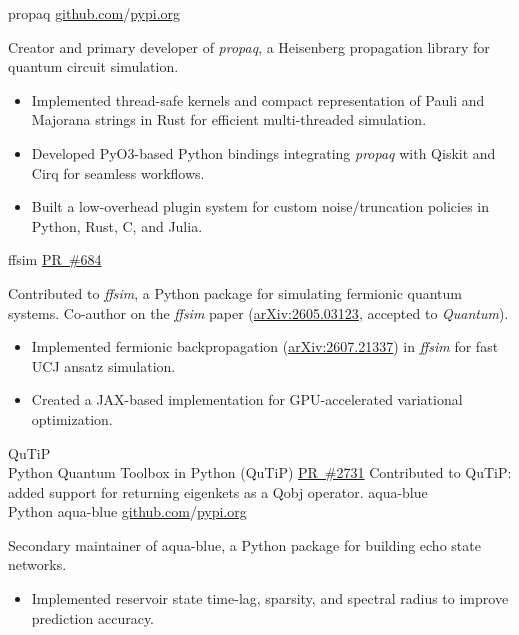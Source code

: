 \documentclass[9pt]{developercv} %
\let\oldhref\href
\newcommand{\linkul}[1]{\setbox0\hbox{#1}\rlap{\textcolor{black!35}{\rule[-1.6pt]{\wd0}{0.3pt}}}\box0}
\renewcommand{\href}[2]{\oldhref{#1}{\linkul{#2}}}
\begin{document}
\begin{entrylist}
		{propaq}
		{\href{https://github.com/hkbelagali/propaq}{github.com}/\href{https://pypi.org/project/propaq/}{pypi.org}}
		{Creator and primary developer of \textit{propaq}, a Heisenberg propagation library for quantum circuit simulation.
		\begin{itemize}[noitemsep,topsep=0pt,parsep=0pt,partopsep=0pt, leftmargin=7pt]
			\item Implemented thread-safe kernels and compact representation of Pauli and Majorana strings in Rust for efficient multi-threaded simulation.
			\item Developed PyO3-based Python bindings integrating \textit{propaq} with Qiskit and Cirq for seamless workflows.
			\item Built a low-overhead plugin system for custom noise/truncation policies in Python, Rust, C, and Julia.
		\end{itemize}
		}
		{ffsim}
		{\href{https://github.com/Qiskit/ffsim/pull/684}{PR \#684}}
		{Contributed to \textit{ffsim}, a Python package for simulating fermionic quantum systems. Co-author on the \textit{ffsim} paper (\href{https://arxiv.org/abs/2605.03123}{arXiv:2605.03123}, accepted to \emph{Quantum}).
		\begin{itemize}[noitemsep,topsep=0pt,parsep=0pt,partopsep=0pt, leftmargin=7pt]
			\item Implemented fermionic backpropagation (\href{https://arxiv.org/abs/2607.21337}{arXiv:2607.21337}) in \textit{ffsim} for fast UCJ ansatz simulation.
			\item Created a JAX-based implementation for GPU-accelerated variational optimization.
		\end{itemize}
		}
\entry
	{QuTiP \\ Python}
	{Quantum Toolbox in Python (QuTiP)}
	{\href{https://github.com/qutip/qutip/pull/2731}{PR \#2731}}
	{Contributed to QuTiP: added support for returning eigenkets as a Qobj operator.}
\entry
	{aqua-blue \\ Python}
	{aqua-blue}
	{\href{https://github.com/jwjeffr/aqua-blue}{github.com}/\href{https://pypi.org/project/aqua-blue/}{pypi.org}}
	{Secondary maintainer of aqua-blue, a Python package for building echo state networks.
	\begin{itemize}[noitemsep,topsep=0pt,parsep=0pt,partopsep=0pt, leftmargin=7pt]
	\item Implemented reservoir state time-lag, sparsity, and spectral radius to improve prediction accuracy.

\end{itemize}}
\end{entrylist}
\end{document}

